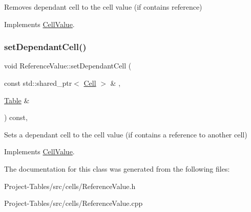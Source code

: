 Removes dependant cell to the cell value (if contains reference) 

Implements \hyperlink{classCellValue_a72b4390db6c53e525550cefade66fb0e}{Cell\+Value}.

\mbox{\label{classReferenceValue_a28ae7e6bd74fa18735456be37c866804}} 
\subsubsection{\texorpdfstring{set\+Dependant\+Cell()}{setDependantCell()}}
{\footnotesize\ttfamily void Reference\+Value\+::set\+Dependant\+Cell (\begin{DoxyParamCaption}\item[{const std\+::shared\+\_\+ptr$<$ \hyperlink{classCell}{Cell} $>$ \&}]{,  }\item[{\hyperlink{classTable}{Table} \&}]{ }\end{DoxyParamCaption}) const\hspace{0.3cm}{\ttfamily [override]}, {\ttfamily [virtual]}}

Sets a dependant cell to the cell value (if contains a reference to another cell) 

Implements \hyperlink{classCellValue_ad2437fb3d4d4a96d9a76c857b3d04231}{Cell\+Value}.



The documentation for this class was generated from the following files\+:\begin{DoxyCompactItemize}
\item 
Project-\/\+Tables/src/cells/Reference\+Value.\+h\item 
Project-\/\+Tables/src/cells/Reference\+Value.\+cpp\end{DoxyCompactItemize}

